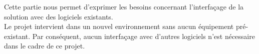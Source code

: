 Cette partie nous permet d'exprimer les besoins concernant l'interfaçage de la solution avec des logiciels existants.\\

Le projet intervient dans un nouvel environnement sans aucun équipement pré-existant. Par conséquent, aucun interfaçage avec d'autres logiciels n'est nécessaire dans le cadre de ce projet.